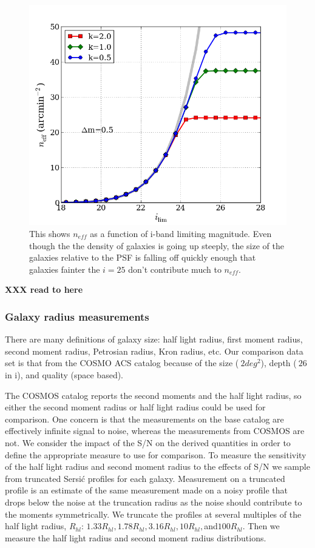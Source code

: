 \documentclass[]{article}
\begin{document}
{%
\begin{figure}[H]
\centering
\includegraphics[width=5in]{validation_figures/neff_m_ir.png}
\caption{This shows $n_{eff}$ as a function of i-band limiting magnitude.  Even though the the density of galaxies is going up steeply, the 
size of the galaxies relative to the PSF is falling off quickly enough that galaxies fainter the $i=25$ don't contribute much to $n_{eff}$.\label{fig:neffvm}}
\end{figure}

{\bf XXX read to here}

\subsubsection{Galaxy radius measurements}
There are many definitions of galaxy size: half light radius, first moment radius, second moment radius, Petrosian radius, Kron radius, etc.
Our comparison data set is that from the COSMO ACS catalog \citep{cosmos} because of the size ($~2deg^2$), depth ($~26$ in i), and
quality (space based).  

The COSMOS catalog reports the second moments and the 
half light radius, so either the second moment radius or half light radius could be used for comparison.  One concern is that the measurements
on the base catalog are effectively infinite signal to noise, whereas the measurements from COSMOS are not.  
We consider the impact of the S/N on the derived quantities in order to define the appropriate measure to use for comparison.
To measure the sensitivity of the half light radius and second moment radius to the effects of S/N we 
sample from truncated Sersi{\'c}
profiles for each galaxy.  Measurement on a truncated profile is an estimate of the same measurement made on a noisy profile that drops below
the noise at the truncation radius as the noise should contribute to the moments symmetrically.
We truncate the profiles at several multiples of the half light radius, $R_{hl}$: $1.33R_{hl}, 1.78R_{hl}, 3.16R_{hl}, 10R_{hl}, $and$100R_{hl}$. 
Then we measure the half light radius and second moment radius distributions.

}
\end{document}
